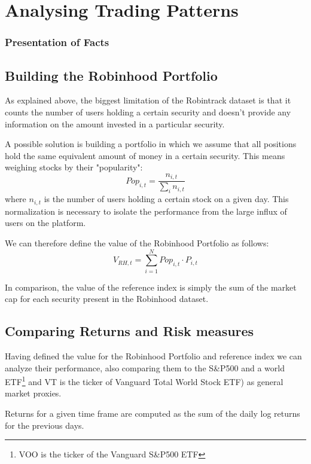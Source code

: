 \section{Analysing Trading Patterns}

\subsubsection{Presentation of Facts}

\subsection{Building the Robinhood Portfolio}
As explained above, the biggest limitation of the Robintrack dataset is that it counts the number of users holding a certain security and doesn't provide any information on the amount invested in a particular security. 

A possible solution is building a portfolio in which we assume that all positions hold the same equivalent amount of money in a certain security. This means weighing stocks by their "popularity":
\begin{equation*}
    Pop_{i,t}=\frac{n_{i,t}}{\sum_in_{i,t}}
\end{equation*}
where $n_{i,t}$ is the number of users holding a certain stock on a given day. This normalization is necessary to isolate the performance from the large influx of users on the platform.

We can therefore define the value of the  Robinhood Portfolio as follows:
\begin{equation*}
    V_{RH,t}=\sum_{i=1}^N Pop_{i,t}\cdot P_{i,t}
\end{equation*}

In comparison, the value of the reference index is simply the sum of the market cap for each security present in the Robinhood dataset. 

\subsection{Comparing Returns and Risk measures}
Having defined the value for the Robinhood Portfolio and reference index we can analyze their performance, also comparing them to the S\&P500 and a world ETF\footnote{VOO is the ticker of the Vanguard S\&P500 ETF} and VT is the ticker of Vanguard Total World Stock ETF) as general market proxies. 

Returns for a given time frame are computed as the sum of the daily log returns for the previous days.

